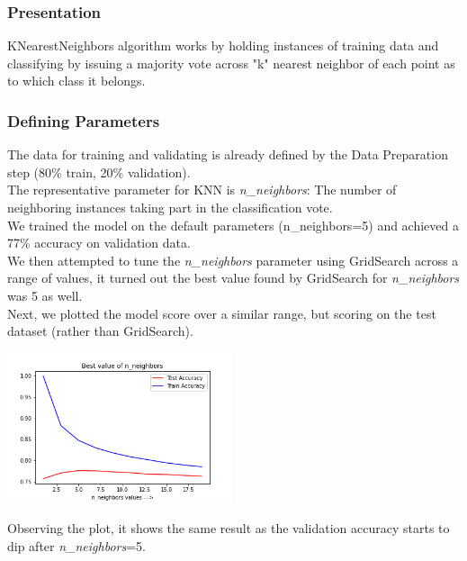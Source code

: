 \subsubsection{Presentation}
KNearestNeighbors algorithm works by holding instances of training data and classifying by issuing a majority vote across "k" nearest neighbor of each point as to which class it belongs.

\subsubsection{Defining Parameters}
The data for training and validating is already defined by the Data Preparation step (80\% train, 20\% validation).\\
The representative parameter for KNN is \emph{n\_neighbors}: The number of neighboring instances taking part in the classification vote.\\

We trained the model on the default parameters (n\_neighbors=5) and achieved a 77\% accuracy on validation data.\\
We then attempted to tune the \emph{n\_neighbors} parameter using GridSearch across a range of values, it turned out the best value found by GridSearch for \emph{n\_neighbors} was 5 as well.\\
Next, we plotted the model score over a similar range, but scoring on the test dataset (rather than GridSearch).
\begin{center}
    \captionsetup{type=figure}
    \includegraphics[width=250px]{knn_complexity.png}
\end{center}
Observing the plot, it shows the same result as the validation accuracy starts to dip after \emph{n\_neighbors}=5.

